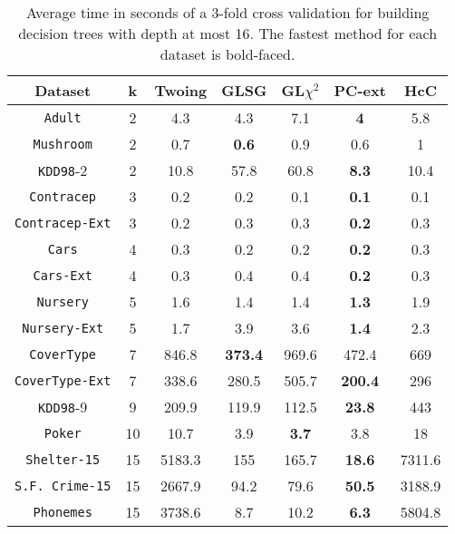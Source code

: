 \begin{table}[]
\small
\caption{Average time in seconds of a 3-fold cross validation
for building decision trees with depth at most 16.
The fastest method for each dataset is bold-faced.}
\centering
\begin{tabular}{c|c|c|c|c|c|c}
Dataset             & k  & Twoing        & GLSG      & GL$\chi^2$  & PC-ext    & HcC     \\ \hline
{\tt Adult}         & 2  & 4.3           & 4.3       & 7.1         &{\bf 4}    & 5.8     \\
{\tt Mushroom}      & 2  & 0.7           & {\bf 0.6} & 0.9         & 0.6       & 1       \\
{\tt KDD98}-2       & 2  & 10.8          & 57.8      & 60.8        &{\bf 8.3}  & 10.4    \\
{\tt Contracep}     & 3  & 0.2           & 0.2       & 0.1         &{\bf 0.1}  & 0.1     \\
{\tt Contracep-Ext} & 3  & 0.2           & 0.3       & 0.3         &{\bf 0.2}  & 0.3     \\
{\tt Cars}          & 4  & 0.3           & 0.2       & 0.2         &{\bf 0.2}  & 0.3    \\
{\tt Cars-Ext}      & 4  & 0.3           & 0.4       & 0.4         &{\bf 0.2}  & 0.3    \\
{\tt Nursery}       & 5  & 1.6           & 1.4       & 1.4         &{\bf 1.3}  & 1.9    \\
{\tt Nursery-Ext}   & 5  & 1.7           & 3.9       & 3.6         &{\bf 1.4}  & 2.3    \\
{\tt CoverType}     & 7  & 846.8         &{\bf 373.4}& 969.6       & 472.4     & 669    \\
{\tt CoverType-Ext} & 7  & 338.6         & 280.5     & 505.7       &{\bf 200.4}& 296    \\
{\tt KDD98}-9       & 9  & 209.9         & 119.9     & 112.5       &{\bf 23.8} & 443    \\
{\tt Poker}         & 10 & 10.7          & 3.9       & {\bf 3.7}   & 3.8       & 18     \\
{\tt Shelter-15}    & 15 & 5183.3        & 155       & 165.7       &{\bf 18.6} & 7311.6 \\
{\tt S.F. Crime-15} & 15 & 2667.9        & 94.2      & 79.6        &{\bf 50.5} & 3188.9 \\
{\tt Phonemes}      & 15 & 3738.6        & 8.7       & 10.2        &{\bf 6.3}  & 5804.8
\end{tabular}
\label{tab:time-16}
\end{table}


